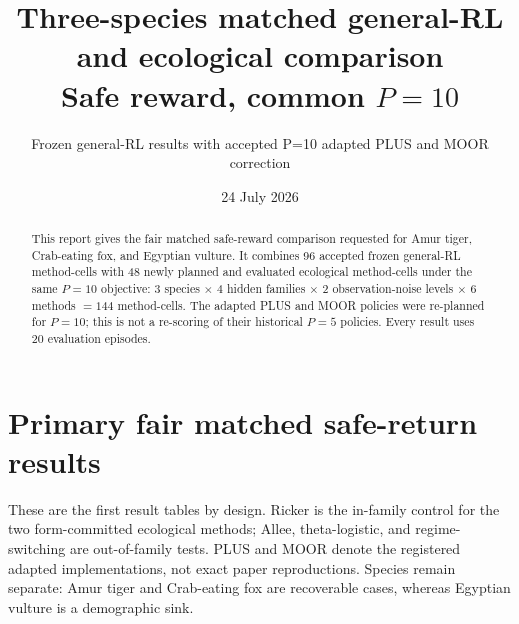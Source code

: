 \documentclass[10pt]{article}
\title{Three-species matched general-RL and ecological comparison\\Safe reward, common \(P=10\)}
\author{Frozen general-RL results with accepted P=10 adapted PLUS and MOOR correction}
\date{24 July 2026}
\begin{document}
\maketitle

\begin{abstract}
This report gives the fair matched safe-reward comparison requested for Amur tiger,
Crab-eating fox, and Egyptian vulture.  It combines 96 accepted frozen general-RL
method-cells with 48 newly planned and evaluated ecological method-cells under the
same \(P=10\) objective: 3 species \(\times\) 4 hidden families \(\times\) 2
observation-noise levels \(\times\) 6 methods \(=144\) method-cells.  The adapted
PLUS and MOOR policies were re-planned for \(P=10\); this is not a re-scoring of
their historical \(P=5\) policies.  Every result uses 20 evaluation episodes.
\end{abstract}

\tableofcontents

\section{Primary fair matched safe-return results}
These are the first result tables by design.  Ricker is the in-family control for
the two form-committed ecological methods; Allee, theta-logistic, and
regime-switching are out-of-family tests.  PLUS and MOOR denote the registered
adapted implementations, not exact paper reproductions.  Species remain separate:
Amur tiger and Crab-eating fox are recoverable cases, whereas Egyptian vulture is
a demographic sink.
\end{document}
